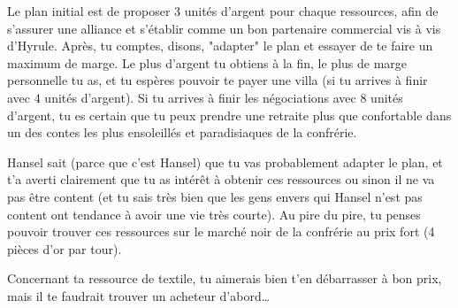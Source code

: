 {	\par Le plan initial est de proposer 3 unités d'argent pour chaque ressources, afin de s'assurer une alliance et s'établir comme un bon partenaire commercial vis à vis d'Hyrule. Après, tu comptes, disons, "adapter" le plan et essayer de te faire un maximum de marge. Le plus d'argent tu obtiens à la fin, le plus de marge personnelle tu as, et tu espères pouvoir te payer une villa (si tu arrives à finir avec 4 unités d'argent). Si tu arrives à finir les négociations avec 8 unités d'argent, tu es certain que tu peux prendre une retraite plus que confortable dans un des contes les plus ensoleillés et paradisiaques de la confrérie.
	
	\par Hansel sait (parce que c'est Hansel) que tu vas probablement adapter le plan, et t'a averti clairement que tu as intérêt à obtenir ces ressources ou sinon il ne va pas être content (et tu sais très bien que les gens envers qui Hansel n'est pas content ont tendance à avoir une vie très courte). Au pire du pire, tu penses pouvoir trouver ces ressources sur le marché noir de la confrérie au prix fort (4 pièces d'or par tour).
	
	\par Concernant ta ressource de textile, tu aimerais bien t'en débarrasser à bon prix, mais il te faudrait trouver un acheteur d'abord\dots
}



